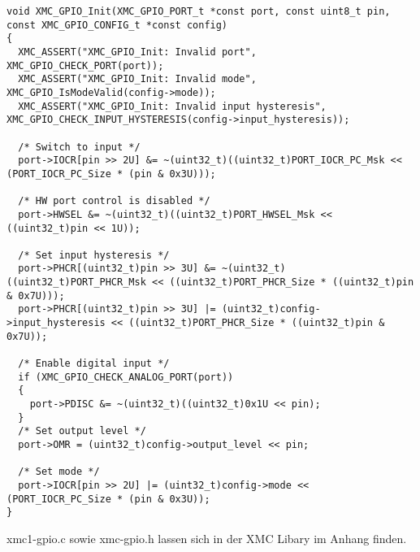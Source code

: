 \begin{minipage}{1\textwidth}
\begin{lstlisting}
void XMC_GPIO_Init(XMC_GPIO_PORT_t *const port, const uint8_t pin, const XMC_GPIO_CONFIG_t *const config)
{
  XMC_ASSERT("XMC_GPIO_Init: Invalid port", XMC_GPIO_CHECK_PORT(port));
  XMC_ASSERT("XMC_GPIO_Init: Invalid mode", XMC_GPIO_IsModeValid(config->mode));
  XMC_ASSERT("XMC_GPIO_Init: Invalid input hysteresis", XMC_GPIO_CHECK_INPUT_HYSTERESIS(config->input_hysteresis));
  
  /* Switch to input */
  port->IOCR[pin >> 2U] &= ~(uint32_t)((uint32_t)PORT_IOCR_PC_Msk << (PORT_IOCR_PC_Size * (pin & 0x3U)));

  /* HW port control is disabled */
  port->HWSEL &= ~(uint32_t)((uint32_t)PORT_HWSEL_Msk << ((uint32_t)pin << 1U));

  /* Set input hysteresis */
  port->PHCR[(uint32_t)pin >> 3U] &= ~(uint32_t)((uint32_t)PORT_PHCR_Msk << ((uint32_t)PORT_PHCR_Size * ((uint32_t)pin & 0x7U)));
  port->PHCR[(uint32_t)pin >> 3U] |= (uint32_t)config->input_hysteresis << ((uint32_t)PORT_PHCR_Size * ((uint32_t)pin & 0x7U));
    
  /* Enable digital input */
  if (XMC_GPIO_CHECK_ANALOG_PORT(port))
  {    
    port->PDISC &= ~(uint32_t)((uint32_t)0x1U << pin);
  }
  /* Set output level */
  port->OMR = (uint32_t)config->output_level << pin;
  
  /* Set mode */
  port->IOCR[pin >> 2U] |= (uint32_t)config->mode << (PORT_IOCR_PC_Size * (pin & 0x3U));
}
\end{lstlisting}
\label{fig:oAPI}
\end{minipage}

xmc1-gpio.c sowie xmc-gpio.h lassen sich in der XMC Libary im Anhang finden.










